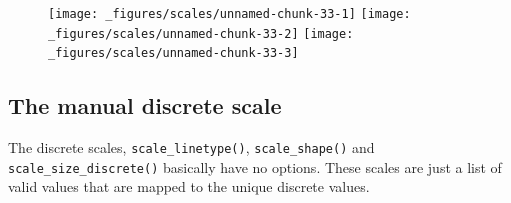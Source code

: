\begin{Shaded}
\begin{Highlighting}[]
\StringTok{ }\NormalTok{(} \NormalTok{:}\NormalTok{, } \NormalTok{:}\NormalTok{, } \NormalTok{(}\NormalTok{, }\NormalTok{, }\NormalTok{))}
\StringTok{ }\StringTok{ }
\StringTok{  }\NormalTok{(}\NormalTok{(}  \NormalTok{) +}\StringTok{ }
\StringTok{  }\NormalTok{(} \NormalTok{) +}
\StringTok{  }\NormalTok{(} \NormalTok{, } \NormalTok{)}
\StringTok{ }\NormalTok{(} \NormalTok{)}
\StringTok{ }\NormalTok{(} \NormalTok{)}
\StringTok{ }\NormalTok{(} \NormalTok{)}
\end{Highlighting}
\end{Shaded}

\begin{figure}[H]
  \texttt{[image: \_figures/scales/unnamed-chunk-33-1]}%
  \texttt{[image: \_figures/scales/unnamed-chunk-33-2]}%
  \texttt{[image: \_figures/scales/unnamed-chunk-33-3]}
\end{figure}

\subsection{The manual discrete scale}\label{sub:scale-manual}

The discrete scales, \texttt{scale\_linetype()}, \texttt{scale\_shape()}
and \texttt{scale\_size\_discrete()} basically have no options. These
scales are just a list of valid values that are mapped to the unique
discrete values.   
 

